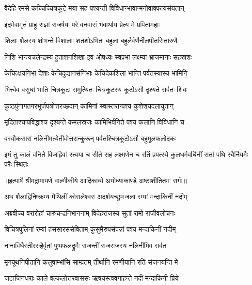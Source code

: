\twolineshloka
{वैदेहि रमसे कच्चिच्चित्रकूटे मया सह}
{पश्यन्ती विविधान्भावान्मनोवाक्कायसंयतान्} %

\twolineshloka
{इदमेवामृतं प्राहू राज्ञां राजर्षयः परे}
{वनवासं भवार्थाय प्रेत्य मे प्रपितामहाः} %

\twolineshloka
{शिलाः शैलस्य शोभन्ते विशालाः शतशोऽभितः}
{बहुला बहुलैर्वर्णैर्नीलपीतसितारुणैः} %

\twolineshloka
{निशि भान्त्यचलेन्द्रस्य हुताशनशिखा इव}
{ओषध्यः स्वप्रभा लक्ष्म्या भ्राजमानाः सहस्रशः} %

\twolineshloka
{केचित्क्षयनिभा देशाः केचिदुद्यानसंनिभाः}
{केचिदेकशिला भान्ति पर्वतस्यास्य भामिनि} %

\twolineshloka
{भित्त्वेव वसुधां भाति चित्रकूटः समुत्थितः}
{चित्रकूटस्य कूटोऽसौ दृश्यते सर्वतः शिवः} %

\twolineshloka
{कुष्ठपुंनागतगरभूर्जपत्रोत्तरच्छदान्}
{कामिनां स्वास्तरान्पश्य कुशेशयदलायुतान्} %

\twolineshloka
{मृदिताश्चापविद्धाश्च दृश्यन्ते कमलस्रजः}
{कामिभिर्वनिते पश्य फलानि विविधानि च} %

\twolineshloka
{वस्वौकसारां नलिनीमत्येतीवोत्तरान्कुरून्}
{पर्वतश्चित्रकूटोऽसौ बहुमूलफलोदकः} %

\fourlineindentedshloka
{इमं तु कालं वनिते विजह्रिवां}
{स्त्वया च सीते सह लक्ष्मणेन च}
{रतिं प्रपत्स्ये कुलधर्मवर्धिनीं}
{ सतां पथि स्वैर्नियमैः परैः स्थितः} %


{॥इत्यार्षे श्रीमद्रामायणे वाल्मीकीये आदिकाव्ये अयोध्याकाण्डे अष्टाशीतितमः सर्गः॥}


\twolineshloka
{अथ शैलाद्विनिष्क्रम्य मैथिलीं कोसलेश्वरः}
{अदर्शयच्छुभजलां रम्यां मन्दाकिनीं नदीम्} %

\twolineshloka
{अब्रवीच्च वरारोहां चारुचन्द्रनिभाननाम्}
{विदेहराजस्य सुतां रामो राजीवलोचनः} %

\twolineshloka
{विचित्रपुलिनां रम्यां हंससारससेविताम्}
{कुसुमैरुपसंपन्नां पश्य मन्दाकिनीं नदीम्} %

\twolineshloka
{नानाविधैस्तीररुहैर्वृतां पुष्पफलद्रुमैः}
{राजन्तीं राजराजस्य नलिनीमिव सर्वतः} %

\twolineshloka
{मृगयूथनिपीतानि कलुषाम्भांसि साम्प्रतम्}
{तीर्थानि रमणीयानि रतिं संजनयन्ति मे} %

\twolineshloka
{जटाजिनधराः काले वल्कलोत्तरवाससः}
{ऋषयस्त्ववगाहन्ते नदीं मन्दाकिनीं प्रिये} %

